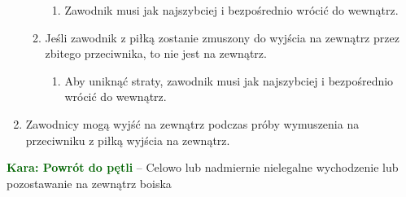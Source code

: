 \documentclass[11pt,a4paper]{article}
\newcommand\penaltyd[2]{\bgroup\textcolor{darkgreen}{\textbf{Kara: #1}} -- #2}
\begin{document}
\begin{enumerate}
\begin{enumerate}
\begin{enumerate}
      \item Zawodnik musi jak najszybciej i bezpośrednio wrócić do wewnątrz.
    \end{enumerate}
    \item Jeśli zawodnik z piłką zostanie zmuszony do wyjścia na zewnątrz przez zbitego przeciwnika, to nie jest na zewnątrz.
    \begin{enumerate}
      \item Aby uniknąć straty, zawodnik musi jak najszybciej i bezpośrednio wrócić do wewnątrz.
    \end{enumerate}
  \end{enumerate}
  \item Zawodnicy mogą wyjść na zewnątrz podczas próby wymuszenia na przeciwniku z piłką wyjścia na zewnątrz.
\end{enumerate}

\penaltyd{Powrót do pętli}{Celowo lub nadmiernie nielegalne wychodzenie lub pozostawanie na zewnątrz boiska}
\end{document}
